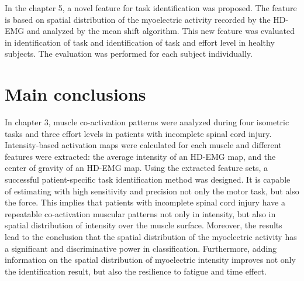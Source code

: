In the chapter 5, a novel feature for task identification was proposed. The feature is based on spatial distribution of the myoelectric activity recorded by the HD-EMG and analyzed by the mean shift algorithm. This new feature was evaluated in identification of task and identification of task and effort level in healthy subjects. The evaluation was performed for each subject individually. 


\section{Main conclusions}

In chapter 3, muscle co-activation patterns were analyzed during four isometric tasks and three effort levels in patients with incomplete spinal cord injury. Intensity-based activation maps were calculated for each muscle and different features were extracted: the average intensity of an HD-EMG map, and the center of gravity of an HD-EMG map. Using the extracted feature sets, a successful patient-specific task identification method was designed. It is capable of estimating with high sensitivity and precision not only the motor task, but also the force. This implies that patients with incomplete spinal cord injury have a repeatable co-activation muscular patterns not only in intensity, but also in spatial distribution of intensity over the muscle surface. Moreover, the results lead to the conclusion that the spatial distribution of the myoelectric activity has a significant and discriminative power in classification. Furthermore, adding information on the spatial distribution of myoelectric intensity improves not only the identification result, but also the resilience to fatigue and time effect.

